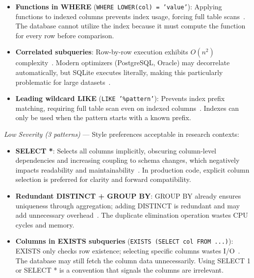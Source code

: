 \documentclass[]{einformatica}
\begin{document}
\begin{itemize}
\item \textbf{Functions in WHERE} (\texttt{WHERE LOWER(col) = 'value'}): Applying functions to indexed columns prevents index usage, forcing full table scans~\cite{karwin2010sqlantipatterns,molinaro2020sqlcookbook,ramakrishnan2003dbms}. The database cannot utilize the index because it must compute the function for every row before comparison.

\item \textbf{Correlated subqueries}: Row-by-row execution exhibits $O(n^2)$ complexity~\cite{karwin2010sqlantipatterns,molinaro2020sqlcookbook,ramakrishnan2003dbms}. Modern optimizers (PostgreSQL, Oracle) may decorrelate automatically, but SQLite executes literally, making this particularly problematic for large datasets~\cite{sqliteBareColumns}.

\item \textbf{Leading wildcard LIKE} (\texttt{LIKE '\%pattern'}): Prevents index prefix matching, requiring full table scan even on indexed columns~\cite{karwin2010sqlantipatterns,molinaro2020sqlcookbook,ramakrishnan2003dbms}. Indexes can only be used when the pattern starts with a known prefix.
\end{itemize}

\textit{Low Severity (3 patterns)} --- Style preferences acceptable in research contexts:

\begin{itemize}
\item \textbf{SELECT *}: Selects all columns implicitly, obscuring column-level dependencies and increasing coupling to schema changes, which negatively impacts readability and maintainability~\cite{karwin2010sqlantipatterns,molinaro2020sqlcookbook}. In production code, explicit column selection is preferred for clarity and forward compatibility.

\item \textbf{Redundant DISTINCT + GROUP BY}: GROUP BY already ensures uniqueness through aggregation; adding DISTINCT is redundant and may add unnecessary overhead~\cite{karwin2010sqlantipatterns,molinaro2020sqlcookbook}. The duplicate elimination operation wastes CPU cycles and memory.

\item \textbf{Columns in EXISTS subqueries} (\texttt{EXISTS (SELECT col FROM ...)}): EXISTS only checks row existence; selecting specific columns wastes I/O~\cite{karwin2010sqlantipatterns,molinaro2020sqlcookbook}. The database may still fetch the column data unnecessarily. Using SELECT 1 or SELECT * is a convention that signals the columns are irrelevant.
\end{itemize}
\end{document}
